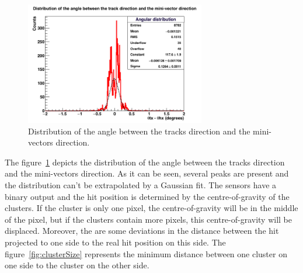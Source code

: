    \begin{figure}[!h]
     \centering
     \includegraphics[width = 0.7\textwidth]{Pictures/deformation/hDiffAngleX_226056.png}
     \caption{Distribution of the angle between the tracks direction and the mini-vectors direction.}
     \label{fig:angRes}
   \end{figure}

   The figure~\ref{fig:angRes} depicts the distribution of the angle between the tracks direction and the mini-vectors direction.
   As it can be seen, several peaks are present and the distribution can't be extrapolated by a Gaussian fit.
   The sensors have a binary output and the hit position is determined by the centre-of-gravity of the clusters.
   If the cluster is only one pixel, the centre-of-gravity will be in the middle of the pixel, but if the clusters contain more pixels, this centre-of-gravity will be displaced.
   Moreover, the are some deviations in the distance between the hit projected to one side to the real hit position on this side.
   The figure~\ref{fig:clusterSize} represents the minimum distance between one cluster on one side to the cluster on the other side.
   
